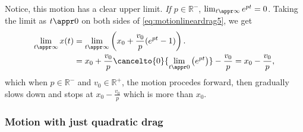 Notice, this motion has a clear upper limit. \emph{If $p \in \mathbb{R}^-$}, $\lim_{t \appr \infty}e^{pt} = 0$. Taking the limit as $t \appr 0$ on both sides of \cref{eq:motionlineardrag5}, we get
\begin{align*}
	\lim_{t \appr \infty} x(t) & = \lim_{t \appr \infty}\left(x_0 + \frac{v_0}{p}(e^{pt} - 1)\right).                                          \\
	                           & = x_0 + \frac{v_0}{p}\cancelto{0}{\lim_{t \appr 0}\left(e^{pt}\right)} - \frac{v_0}{p} = x_0 - \frac{v_0}{p},
\end{align*}
which when $p \in \mathbb{R}^-$ and $v_0\in\mathbb{R}^+$, the motion procedes forward, then gradually slows down and stops at $x_0 - \frac{v_0}{p}$ which is more than $x_0$.

\subsubsection{Motion with just quadratic drag}

